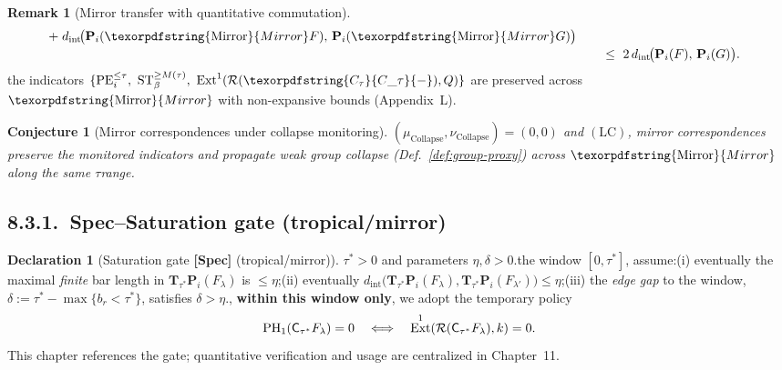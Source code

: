 \documentclass[11pt]{article}
\DeclareMathOperator{\Ext}{Ext}
\DeclareRobustCommand{\hyp}{\nobreakdash-}
\newcommand{\C}{\mathsf{C}}
\newcommand{\Rfun}{\mathcal{R}}
\numberwithin{equation}{section}
\newtheorem{conjecture}{Conjecture}[section]
\theoremstyle{definition}
\newtheorem{remark}[theorem]{Remark}
\newtheorem{declaration}[theorem]{Declaration}
\DeclareRobustCommand{\Ctau}{\texorpdfstring{\ensuremath{C_{\tau}}}{C\_\tau}}
\DeclareRobustCommand{\LC}{\texorpdfstring{\ensuremath{\mathrm{(LC)}}}{(LC)}}
\DeclareRobustCommand{\Mirror}{\texorpdfstring{\ensuremath{\operatorname{Mirror}}}{Mirror}}
\providecommand{\n}{\unskip\space}
\begin{document}
{\begin{remark}[Mirror transfer with quantitative commutation]
\begin{align}
     \;+\; d_{\mathrm{int}}\!\big(\mathbf{P}_i(\Mirror F),\,\mathbf{P}_i(\Mirror G)\big)\n\label{eq:mirror-ctau-stability}\\[-2pt]\n&\qquad\le\ 2\,d_{\mathrm{int}}\!\big(\mathbf{P}_i(F),\,\mathbf{P}_i(G)\big).\n\notag\n\end{align}\nHence the indicators \(\{\mathrm{PE}_i^{\le\tau},\ \mathrm{ST}_{\beta}^{\ge M(\tau)},\ \Ext^1(\Rfun(\Ctau{-}),Q)\}\) are preserved across \(\Mirror\) with non\hyp expansive bounds (Appendix~L).\n\end{remark}\n}\n\n\begin{conjecture}[Mirror correspondences under collapse monitoring]\label{conj:mirror}\nAssuming \((\mu_{\mathrm{Collapse}},\nu_{\mathrm{Collapse}})=(0,0)\) and \LC, mirror correspondences preserve the monitored indicators and propagate weak group collapse (Def.~\ref{def:group-proxy}) across \(\Mirror\) along the same \(\tau\)\nobreakdash range.\n\end{conjecture}\n\n\subsection*{8.3.1.\ Spec–Saturation gate (tropical/mirror)}\n\begin{declaration}[Saturation gate \textbf{[Spec]} (tropical/mirror)]\label{gate:8-saturation}\nFix \(\tau^\ast>0\) and parameters \(\eta,\delta>0\).\nOn the window \([0,\tau^\ast]\), assume:\n(i) eventually the maximal \emph{finite} bar length in \(\mathbf{T}_{\tau^\ast}\mathbf{P}_i(F_\lambda)\) is \(\le \eta\);\n(ii) eventually \(d_{\mathrm{int}}\!\big(\mathbf{T}_{\tau^\ast}\mathbf{P}_i(F_\lambda),\mathbf{T}_{\tau^\ast}\mathbf{P}_i(F_{\lambda'})\big)\le \eta\);\n(iii) the \emph{edge gap} to the window, \(\delta:=\tau^\ast-\max\{b_r<\tau^\ast\}\), satisfies \(\delta>\eta\).\nThen, \textbf{within this window only}, we adopt the temporary policy\n\[\n\mathrm{PH}_1(\C_{\tau^\ast}F_\lambda)=0\quad\Longleftrightarrow\quad \Ext^1(\Rfun(\C_{\tau^\ast}F_\lambda),k)=0.
\]
This chapter references the gate; quantitative verification and usage are centralized in Chapter~11.
\end{declaration}
\end{document}

